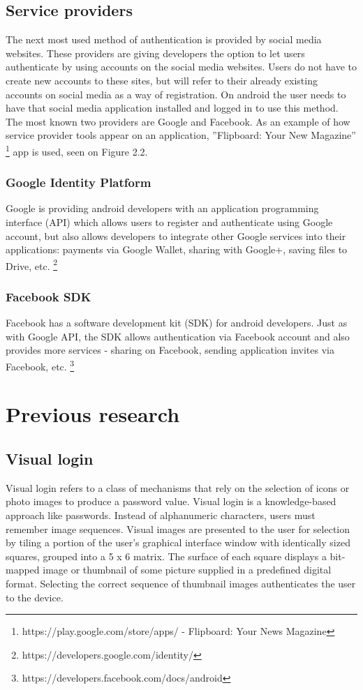 \subsection{Service providers}
The next most used method of authentication is provided by social media websites. These providers are giving developers the option to let users authenticate by using accounts on the social media websites. Users do not have to create new accounts to these sites, but will refer to their already existing accounts on social media as a way of registration. On android the user needs to have that social media application installed and logged in to use this method. The most known two providers are Google and Facebook. As an example of how service provider tools appear on an application, ''Flipboard: Your New Magazine'' \footnote[8]{https://play.google.com/store/apps/ - Flipboard: Your News Magazine} app is used, seen on Figure 2.2.

\subsubsection{Google Identity Platform}
Google is providing android developers with an application programming interface (API) which allows users to register and authenticate using Google account, but also allows developers to integrate other Google services into their applications: payments via Google Wallet, sharing with Google+, saving files to Drive, etc. \footnote[9]{https://developers.google.com/identity/}

\subsubsection{Facebook SDK}
Facebook has a software development kit (SDK) for android developers. Just as with Google API, the SDK allows authentication via Facebook account and also provides more services - sharing on Facebook, sending application invites via Facebook, etc. \footnote[10]{https://developers.facebook.com/docs/android}

\section{Previous research}

\subsection{Visual login}
Visual login refers to a class of mechanisms that rely on the selection of icons or photo images to produce a
password value. Visual login is a knowledge-based approach like passwords. Instead of alphanumeric characters, users must remember image sequences. Visual images are presented to the user for selection by tiling a portion of the user's graphical interface window with identically sized squares, grouped into a 5 x 6 matrix. The surface of each square displays a bit-mapped image or thumbnail of some picture supplied in a predefined digital format. Selecting the correct sequence of thumbnail images authenticates the user to the device. \cite{jansen2003authenticating}

